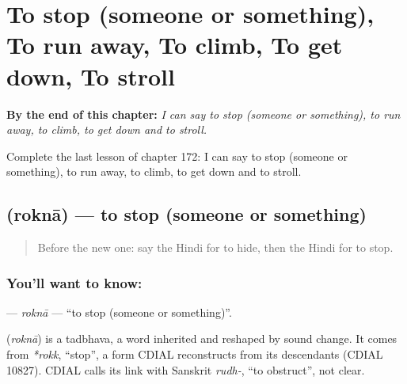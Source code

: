 
\chapter{To stop (someone or something), To run away, To climb, To get down, To stroll}
\label{ch:hi-to-stop-someone-or-something-to-run-away-to-climb-to-get-down-to-stroll}

\begin{chapteropening}
\textbf{By the end of this chapter:} \emph{I can say to stop (someone or something), to run away, to climb, to get down and to stroll.}

Complete the last lesson of chapter 172: I can say to stop (someone or something), to run away, to climb, to get down and to stroll.
\end{chapteropening}

\section[\texorpdfstring{\hi{रोकना} (roknā)}{रोकना (roknā)}]{ (roknā) — to stop (someone or something)}

\label{lesson:HI-C172-rokna}



\begin{quote}
Before the new one: say the Hindi for to hide, then the Hindi for to stop.
\end{quote}

\subsection*{You'll want to know: }
\textbf{} — \emph{roknā} — \textquotedblleft{}to stop (someone or something)\textquotedblright{}.

\begin{cousinweb}
\textbf{} (\emph{roknā}) is a tadbhava, a word inherited and reshaped by sound change. It comes from \emph{*rokk}, \textquotedblleft{}stop\textquotedblright{}, a form CDIAL reconstructs from its descendants (CDIAL 10827). CDIAL calls its link with Sanskrit \emph{rudh-}, \textquotedblleft{}to obstruct\textquotedblright{}, not clear.
\end{cousinweb}

